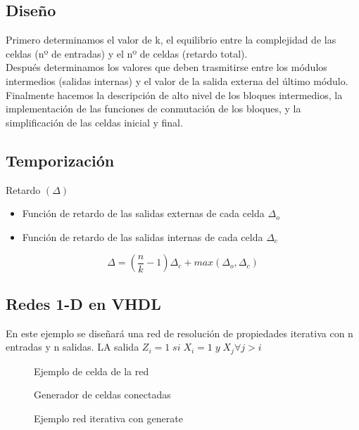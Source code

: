 \subsection{Diseño}
Primero determinamos el valor de k, el equilibrio entre la complejidad de las celdas (nº de entradas) y el nº de celdas (retardo total).\\
Después determinamos los valores que deben trasmitirse entre los módulos intermedios (salidas internas) y el valor de la salida externa del último módulo. \\
Finalmente hacemos la descripción de alto nivel de los bloques intermedios, la implementación de las funciones de conmutación de los bloques, y la simplificación de las celdas inicial y final.

\subsection{Temporización}
Retardo $\left(\Delta\right)$
\begin{itemize}
	\item Función de retardo de las salidas externas de cada celda $\Delta_{o}$
	\item Función de retardo de las salidas internas de cada celda $\Delta_{c}$
\end{itemize}
\[
	\Delta = \left(\frac{n}{k}-1\right)\Delta_{c}+max\left(\Delta_{o}, \Delta_{c}\right)
\]

\subsection{Redes 1-D en VHDL}
En este ejemplo se diseñará una red de resolución de propiedades iterativa con n entradas y n salidas. LA salida $Z_{i} = 1\; si\; X_{i}= 1\; y\; X_{j} \forall j>i$

\begin{multicols}{2}
	\begin{figure}[H]
		\centering
		
		\caption{Ejemplo de celda de la red}
	\end{figure}
	\vfill
	\null
	\begin{figure}[H]
		\centering
		
		\caption{Generador de celdas conectadas}
	\end{figure}
\end{multicols}
\begin{figure}[H]
	\centering
	
	\caption{Ejemplo red iterativa con generate}
\end{figure}

